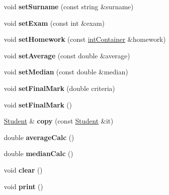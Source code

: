 \begin{DoxyCompactItemize}
void {\bfseries set\+Surname} (const string \&surname)
\item 
\mbox{\label{class_student_ae4dfc9ea1f586f44d4f748f667db9ac3}} 
void {\bfseries set\+Exam} (const int \&exam)
\item 
\mbox{\label{class_student_a5de99e220695c8bdb9a334caee930209}} 
void {\bfseries set\+Homework} (const \mbox{\hyperlink{class_vector}{int\+Container}} \&homework)
\item 
\mbox{\label{class_student_ab5010b86605d1d0ead416455fa144163}} 
void {\bfseries set\+Average} (const double \&average)
\item 
\mbox{\label{class_student_a92b23c191cbd9dbd403eae401898636b}} 
void {\bfseries set\+Median} (const double \&median)
\item 
\mbox{\label{class_student_ab58d6c58a651bb84ce2dfa1be2e387c5}} 
void {\bfseries set\+Final\+Mark} (double criteria)
\item 
\mbox{\label{class_student_abeae521af2db0dc5ffc79106587d9d14}} 
void {\bfseries set\+Final\+Mark} ()
\item 
\mbox{\label{class_student_a0b8822a2ad7f05bb7a65851a5727d70f}} 
\mbox{\hyperlink{class_student}{Student}} \& {\bfseries copy} (const \mbox{\hyperlink{class_student}{Student}} \&it)
\item 
\mbox{\label{class_student_a2d3d16d6dba9d1e989c3985c2e6af6bf}} 
double {\bfseries average\+Calc} ()
\item 
\mbox{\label{class_student_a1aede6fb6adb0e0a2b92aa5ec972c22f}} 
double {\bfseries median\+Calc} ()
\item 
\mbox{\label{class_student_a6af64b9481302195e117c2a112962738}} 
void {\bfseries clear} ()
\item 
\mbox{\label{class_student_a78e0a36e97d117f12bd1879ca7e5cf9c}} 
void {\bfseries print} ()
\item 
\mbox{\label{class_student_ae57abcd1c084ecb9de3ae17dc7244b8a}} 

\end{DoxyCompactItemize}
